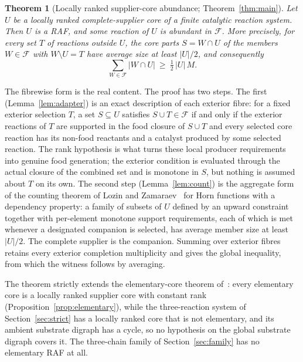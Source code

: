 \documentclass[11pt,a4paper]{article}
\theoremstyle{plain}
\newtheorem{theorem}{Theorem}[section]
\theoremstyle{definition}
\theoremstyle{remark}
\newcommand{\FF}{\mathcal F}
\begin{document}
\begin{theorem}[Locally ranked supplier-core abundance; Theorem~\ref{thm:main}]\label{thm:intro-main}
Let $U$ be a locally ranked complete-supplier core of a finite catalytic reaction system. Then $U$ is a RAF, and some reaction of $U$ is abundant in $\FF$. More precisely, for every set $T$ of reactions outside $U$, the core parts $S=W\cap U$ of the members $W\in\FF$ with $W\setminus U=T$ have average size at least $|U|/2$, and consequently
\[
\sum_{W\in\FF}|W\cap U|\ \ge\ \tfrac12\,|U|\,M .
\]
\end{theorem}

The fibrewise form is the real content. The proof has two steps. The first (Lemma~\ref{lem:adapter}) is an exact description of each exterior fibre: for a fixed exterior selection $T$, a set $S\subseteq U$ satisfies $S\cup T\in\FF$ if and only if the exterior reactions of $T$ are supported in the food closure of $S\cup T$ and every selected core reaction has its non-food reactants and a catalyst produced by some selected reaction. The rank hypothesis is what turns these local producer requirements into genuine food generation; the exterior condition is evaluated through the actual closure of the combined set and is monotone in $S$, but nothing is assumed about $T$ on its own. The second step (Lemma~\ref{lem:count}) is the aggregate form of the counting theorem of Lozin and Zamaraev~\cite{lozin2024union} for Horn functions with a dependency property: a family of subsets of $U$ defined by an upward constraint together with per-element monotone support requirements, each of which is met whenever a designated companion is selected, has average member size at least $|U|/2$. The complete supplier is the companion. Summing over exterior fibres retains every exterior completion multiplicity and gives the global inequality, from which the witness follows by averaging.

The theorem strictly extends the elementary-core theorem of~\cite{elementary2026}: every elementary core is a locally ranked supplier core with constant rank (Proposition~\ref{prop:elementary}), while the three-reaction system of Section~\ref{sec:strict} has a locally ranked core that is not elementary, and its ambient substrate digraph has a cycle, so no hypothesis on the global substrate digraph covers it. The three-chain family of Section~\ref{sec:family} has no elementary RAF at all.
\end{document}
